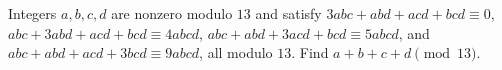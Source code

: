 Integers $a,b,c,d$ are nonzero modulo $13$ and satisfy $3abc+abd+acd+bcd\equiv0$, $abc+3abd+acd+bcd\equiv4abcd$, $abc+abd+3acd+bcd\equiv5abcd$, and $abc+abd+acd+3bcd\equiv9abcd$, all modulo $13$. Find $a+b+c+d\pmod{13}$.
